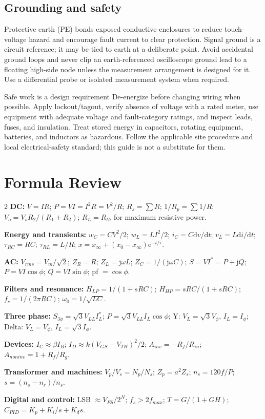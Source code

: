 \documentclass[10pt]{article}
\newcommand{\dd}{\mathrm{d}}
\newcommand{\jj}{\mathrm{j}}
\newcommand{\e}{\mathrm{e}}
\begin{document}
\subsection{Grounding and safety}
Protective earth (PE) bonds exposed conductive enclosures to reduce touch-voltage
hazard and encourage fault current to clear protection. Signal ground is a circuit
reference; it may be tied to earth at a deliberate point. Avoid accidental ground
loops and never clip an earth-referenced oscilloscope ground lead to a floating
high-side node unless the measurement arrangement is designed for it. Use a
differential probe or isolated measurement system when required.

\begin{cautionbox}{Safe work is a design requirement}
De-energize before changing wiring when possible. Apply lockout/tagout, verify
absence of voltage with a rated meter, use equipment with adequate voltage and
fault-category ratings, and inspect leads, fuses, and insulation. Treat stored
energy in capacitors, rotating equipment, batteries, and inductors as hazardous.
Follow the applicable site procedure and local electrical-safety standard; this
guide is not a substitute for them.
\end{cautionbox}

\section{Formula Review}
\begin{multicols}{2}
\textbf{DC:} $V=IR$; $P=VI=I^2R=V^2/R$; $R_s=\sum R$;
$1/R_p=\sum1/R$; $V_o=V_sR_2/(R_1+R_2)$; $R_L=R_{th}$ for maximum resistive
power.

\textbf{Energy and transients:} $w_C=CV^2/2$; $w_L=LI^2/2$;
$i_C=C\dd v/\dd t$; $v_L=L\dd i/\dd t$; $\tau_{RC}=RC$;
$\tau_{RL}=L/R$; $x=x_\infty+(x_0-x_\infty)\e^{-t/\tau}$.

\textbf{AC:} $V_{rms}=V_m/\sqrt2$; $Z_R=R$; $Z_L=\jj\omega L$;
$Z_C=1/(\jj\omega C)$; $S=VI^*=P+\jj Q$; $P=VI\cos\phi$;
$Q=VI\sin\phi$; pf $=\cos\phi$.

\textbf{Filters and resonance:} $H_{LP}=1/(1+sRC)$;
$H_{HP}=sRC/(1+sRC)$; $f_c=1/(2\pi RC)$; $\omega_0=1/\sqrt{LC}$.

\textbf{Three phase:} $S_{3\phi}=\sqrt3V_{LL}I_L^*$;
$P=\sqrt3V_{LL}I_L\cos\phi$; Y: $V_L=\sqrt3V_\phi$, $I_L=I_\phi$;
Delta: $V_L=V_\phi$, $I_L=\sqrt3I_\phi$.

\textbf{Devices:} $I_C\approx\beta I_B$; $I_D\approx k(V_{GS}-V_{TH})^2/2$;
$A_{inv}=-R_f/R_{in}$; $A_{noninv}=1+R_f/R_g$.

\textbf{Transformer and machines:} $V_p/V_s=N_p/N_s$;
$Z_p=a^2Z_s$; $n_s=120f/P$; $s=(n_s-n_r)/n_s$.

\textbf{Digital and control:} LSB $\approx V_{FS}/2^N$; $f_s>2f_{max}$;
$T=G/(1+GH)$; $C_{PID}=K_p+K_i/s+K_ds$.
\end{multicols}
\end{document}
